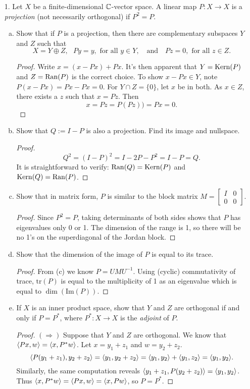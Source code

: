 
\begin{itemize}

\item[1.] Let $X$ be a finite-dimensional $\mathbb{C}$-vector space. A linear map $P:X \rightarrow X$ is a \textit{projection} (not necessarily orthogonal) if $P^2 = P$.
\begin{enumerate}[(a)]
\item Show that if $P$ is a projection, then there are complementary subspaces $Y$ and $Z$ such that 
$$X=Y\oplus Z, \ \ \ Py=y, \text{ for all } y \in Y, \ \ \ \text{ and } \ \ \ Pz=0, \text{ for all } z \in Z.$$
\begin{proof}
Write $x = (x - Px) + Px$. It's then apparent that $Y = \operatorname{Kern}(P)$ and $Z = \operatorname{Ran}(P)$ is the correct choice. To show $x - Px \in Y$, note $P(x - Px) = Px - Px = 0$. For $Y \cap Z = \{0\}$, let $x$ be in both. As $x \in Z$, there exists a $z$ such that $x = Pz$. Then 
$$x = Pz = P(Pz)) = Px = 0.$$
\end{proof}

\item Show that $Q:=I-P$ is also a projection. Find its image and nullspace.
\begin{proof}
$$Q^2 = (I-P)^2 = I - 2P - P^2 = I-P = Q.$$
It is straightforward to verify: $\operatorname{Ran}(Q) = \operatorname{Kern}(P)$ and $\operatorname{Kern}(Q) = \operatorname{Ran}(P)$.
\end{proof}

\item Show that in matrix form, $P$ is similar to the block matrix $M = \begin{bmatrix}
I & 0 \\
0 & 0
\end{bmatrix}.$
\begin{proof}
Since $P^2 = P$, taking determinants of both sides shows that $P$ has eigenvalues only 0 or 1. The dimension of the range is 1, so there will be no 1's on the superdiagonal of the Jordan block. 
\end{proof}

\item Show that the dimension of the image of $P$ is equal to its trace.
\begin{proof}
From (c) we know $P = UMU^{-1}$. Using (cyclic) commutativity of trace, $\text{tr}(P)$ is equal to the multiplicity of 1 as an eigenvalue which  is equal to $\dim(\text{Im}(P))$.
\end{proof}

\item If $X$ is an inner product space, show that $Y$ and $Z$ are orthogonal if and only if $P=P^*$, where $P^*:X \rightarrow X$ is the \textit{adjoint} of $P$.
\begin{proof}
$(\Rightarrow)$ Suppose that $Y$ and $Z$ are orthogonal. We know that $\langle{}Px,w\rangle = \langle{}x,P^* w\rangle$. Let $x=y_1+z_1$ and $w = y_2+z_2$.
\[\langle{}P(y_1 + z_1),y_2 + z_2\rangle = \langle{}y_1,y_2 + z_2\rangle = \langle{}y_1,y_2\rangle + \langle{}y_1,z_2\rangle = \langle{}y_1,y_2\rangle.\]
Similarly, the same computation reveals $\langle{}y_1 + z_1,P(y_2 + z_2)\rangle = \langle{}y_1,y_2\rangle$. Thus $\langle{}x,P^* w\rangle = \langle{}Px,w\rangle = \langle{}x,P w\rangle$, so $P=P^*$.


\end{proof}
\end{enumerate}
\end{itemize}
